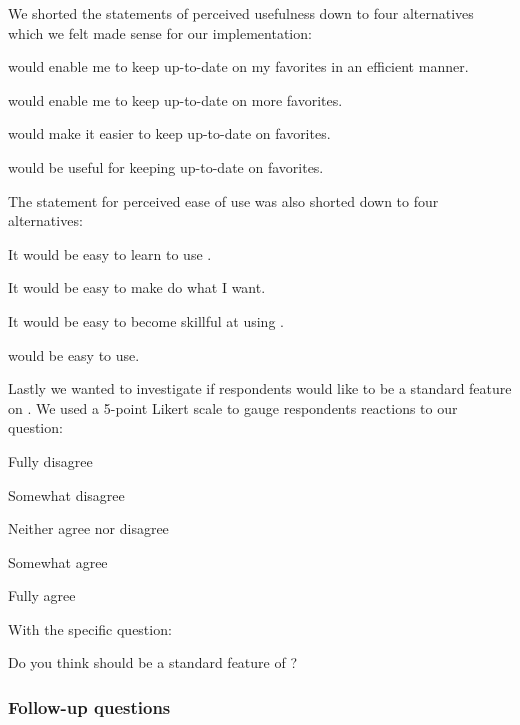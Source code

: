 We shorted the statements of perceived usefulness down to four alternatives
which we felt made sense for our implementation:

\begin{items}
  \item \latest{} would enable me to keep up-to-date on my favorites in an
    efficient manner.
  \item \latest{} would enable me to keep up-to-date on more favorites.
  \item \latest{} would make it easier to keep up-to-date on favorites.
  \item \latest{} would be useful for keeping up-to-date on favorites.
\end{items}

The statement for perceived ease of use was also shorted down to four
alternatives:

\begin{items}
  \item It would be easy to learn to use \latest{}.
  \item It would be easy to make \latest{} do what I want.
  \item It would be easy to become skillful at using \latest{}.
  \item \latest{} would be easy to use.
\end{items}

\removeline

Lastly we wanted to investigate if respondents would like \latest{} to be a
standard feature on \urort{}.
We used a 5-point Likert scale \citep{likert32} to gauge respondents
reactions to our question:

\begin{items}
  \item Fully disagree
  \item Somewhat disagree
  \item Neither agree nor disagree
  \item Somewhat agree
  \item Fully agree
\end{items}

With the specific question:

\begin{items}
  \item Do you think \latest{} should be a standard feature of \urort{}?
\end{items}

\subsubsection{Follow-up questions}

